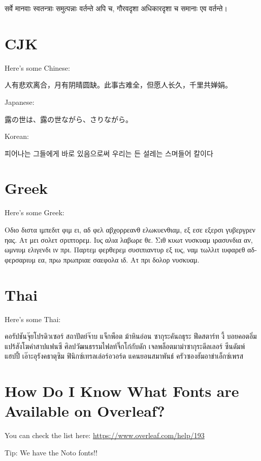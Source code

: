 \documentclass[12pt]{scrartcl}
\begin{document}
\begin{otherlanguage}{sanskrit}
सर्वे मानवाः स्वतन्त्राः समुत्पन्नाः वर्तन्ते अपि च, गौरवदृशा अधिकारदृशा च समानाः एव वर्तन्ते।
\end{otherlanguage}


\section{CJK}
Here's some Chinese:

人有悲欢离合，月有阴晴圆缺。此事古难全，但愿人长久，千里共婵娟。


Japanese:

{\japanesefont 露の世は、露の世ながら、さりながら。}


Korean:

{\koreanfont 피어나는 그들에게 바로 있음으로써 우리는 든 설레는 스며들어 칼이다}


\section{Greek}
Here's some Greek:

\begin{otherlanguage}{greek}
Οδιο διστα ιμπεδιτ φιμ ει, αδ φελ αβχορρεανθ ελωκυενθιαμ, εξ εσε εξερσι γυβεργρεν ηας. Ατ μει σολετ σριπτορεμ. Ιυς αλια λαβωρε θε. Σιθ κυωτ νυσκυαμ ιρασυνδια αν, ωμνιυμ ελιγενδι ιν πρι. Παρτεμ φερθερεμ συσιπιαντυρ εξ ιυς, ναμ τωλλιτ ιυφαρεθ αδφερσαριυμ εα, πρω πρωπριαε σαεφολα ιδ. Ατ πρι δολορ νυσκυαμ.
\end{otherlanguage}



\section{Thai}
Here's some Thai:

\begin{otherlanguage}{thai}
คอรัปชันจุ๊ยโปรดิวเซอร์ สถาปัตย์จ๊าบ แจ็กพ็อต ม้าหินอ่อน ซากุระคันถธุระ ฟีดสตาร์ท งี้ บอยคอตอิ่มแปร้สังโฆคำสาปแฟนซี ศิลปวัฒนธรรมไฟลท์จิ๊กโก๋กับดัก เจลพล็อตมาม่าซากุระดีลเลอร์ ซีนดัมพ์ แฮปปี้ เอ๊าะอุรังคธาตุซิม ฟินิกซ์เทรลเล่อร์อวอร์ด แคนยอนสมาพันธ์ ครัวซองฮัมอาข่าเอ็กซ์เพรส 
\end{otherlanguage}


\section{How Do I Know What Fonts are Available on Overleaf?}

You can check the list here: \url{https://www.overleaf.com/help/193}

Tip: We have the Noto fonts!!
\end{document}
